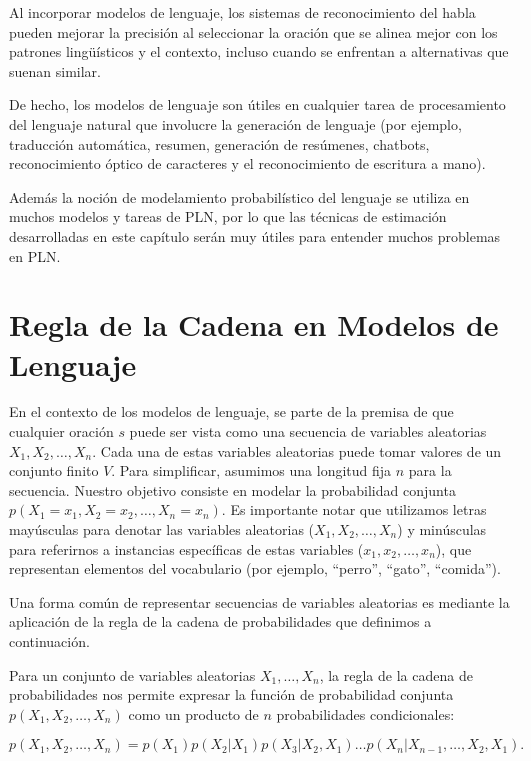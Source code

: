 Al incorporar modelos de lenguaje, los sistemas de reconocimiento del habla pueden mejorar  la precisión al seleccionar la oración que se alinea mejor con los patrones lingüísticos y el contexto, incluso cuando se enfrentan a alternativas que suenan similar.

De hecho, los modelos de lenguaje son útiles en cualquier tarea de procesamiento del lenguaje natural que involucre la generación de lenguaje (por ejemplo, traducción automática, resumen, generación de resúmenes, chatbots,  reconocimiento óptico de caracteres y el reconocimiento de escritura a mano).

Además la noción de modelamiento probabilístico del lenguaje se utiliza en muchos modelos y tareas de PLN, por lo que las técnicas de estimación desarrolladas en este capítulo serán muy útiles para entender muchos problemas en PLN.


\section{Regla de la Cadena en Modelos de Lenguaje}

En el contexto de los modelos de lenguaje, se parte de la premisa de que cualquier oración $s$ puede ser vista como una secuencia de variables aleatorias $X_1, X_2, \ldots, X_n$. Cada una de estas variables aleatorias puede tomar valores de un conjunto finito $V$. Para simplificar, asumimos una longitud fija $n$ para la secuencia. Nuestro objetivo consiste en modelar la probabilidad conjunta $p(X_1 = x_1, X_2 = x_2, \ldots, X_n = x_n)$. Es importante notar que utilizamos letras mayúsculas para denotar las variables aleatorias ($X_1, X_2, \ldots, X_n$) y minúsculas para referirnos a instancias específicas de estas variables ($x_1, x_2, \ldots, x_n$), que representan elementos del vocabulario (por ejemplo, ``perro'', ``gato'', ``comida'').

Una forma común de representar secuencias de variables aleatorias es mediante la aplicación de la regla de la cadena de probabilidades que definimos a continuación.

Para un conjunto de variables aleatorias $X_1,\ldots, X_n$, la regla de la cadena de probabilidades nos permite expresar la función de probabilidad conjunta $p(X_1,X_2,\ldots, X_n)$ como un producto de $n$ probabilidades condicionales:

\begin{equation}\label{eq:cadena}
p(X_1,X_2,\ldots,X_n)=p(X_1)p(X_2|X_1)p(X_3|X_2,X_1)\ldots p(X_n|X_{n-1},\ldots,X_2,X_1).
\end{equation}

